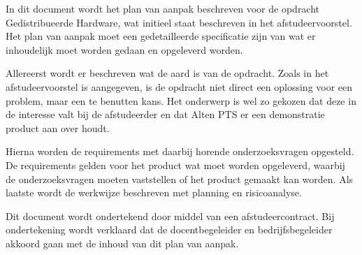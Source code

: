 \documentclass{../local}
\begin{document}
In dit document wordt het plan van aanpak beschreven voor de opdracht Gedistribueerde Hardware, wat initieel staat beschreven in het afstudeervoorstel. Het plan van aanpak moet een gedetailleerde specificatie zijn van wat er inhoudelijk moet worden gedaan en opgeleverd worden.

Allereerst wordt er beschreven wat de aard is van de opdracht. Zoals in het afstudeervoorstel is aangegeven, is de opdracht niet direct een oplossing voor een problem, maar een te benutten kans. Het onderwerp is wel zo gekozen dat deze in de interesse valt bij de afstudeerder en dat Alten PTS er een demonstratie product aan over houdt. 

Hierna worden de requirements met daarbij horende onderzoeksvragen opgesteld. De requirements gelden voor het product wat moet worden opgeleverd, waarbij de onderzoeksvragen moeten vaststellen of het product gemaakt kan worden. Als laatste wordt de werkwijze beschreven met planning en risicoanalyse.

Dit document wordt ondertekend door middel van een afstudeercontract. Bij ondertekening wordt verklaard dat de docentbegeleider en bedrijfsbegeleider akkoord gaan met de inhoud van dit plan van aanpak.
\end{document}
